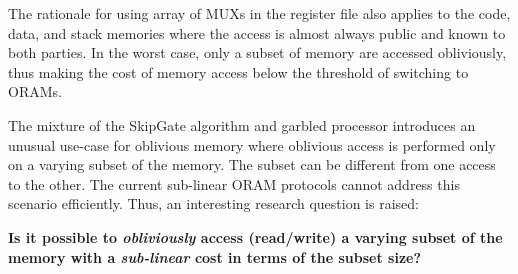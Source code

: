 The rationale for using array of MUXs in the register file also applies to the code, data, and stack memories where the access is almost always public and known to both parties.
In the worst case, only a subset of memory are accessed obliviously, thus making the cost of memory access below the threshold of switching to ORAMs.

The mixture of the SkipGate algorithm and garbled processor introduces an unusual use-case for oblivious memory where oblivious access is performed only on a varying subset of the memory.
The subset can be different from one access to the other.
The current sub-linear ORAM protocols cannot address this scenario efficiently. Thus, an interesting research question is raised:

\textbf{Is it possible to \textit{obliviously} access (read/write) a varying subset of the memory with a \textit{sub-linear} cost in terms of the subset size?}
